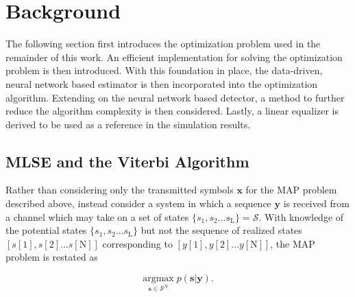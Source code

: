 \documentclass[12pt,a4paper]{report}
\begin{document}
\section{Background}
The following section first introduces the optimization problem used in the remainder of this work. An efficient implementation for solving the optimization problem is then introduced. With this foundation in place, the data-driven, neural network based estimator is then incorporated into the optimization algorithm. 
Extending on the neural network based detector, a method to further reduce the algorithm complexity is then considered. Lastly, a linear equalizer is derived to be used as a reference in the simulation results. 
\subsection{MLSE and the Viterbi Algorithm}
Rather than considering only the transmitted symbols $\mathbf{x}$  for the MAP problem described above, instead consider a system in which a sequence $\mathbf{y}$ is received from a channel which may take on a set of states $\{s_1, s_2... s_{\text{L}}\} = \mathcal{S}$. With knowledge of the potential states $\{s_1, s_2... s_{\text{L}}\}$ but not the sequence of realized states $[s[1], s[2]... s[\text{N}]]$ corresponding to $[y[1], y[2]... y[\text{N}]]$, the MAP problem is restated as

\begin{equation*}
\underset{\mathbf{s}\in\mathcal{S}^N}{\text{argmax}} \; p(\mathbf{s}|\mathbf{y}).
\end{equation*} 
\end{document}
